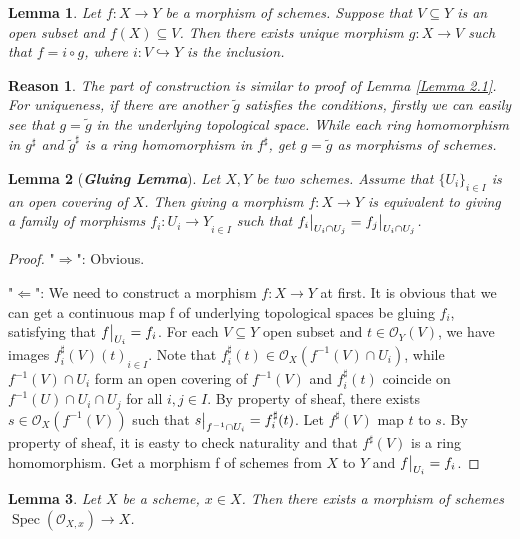 \documentclass{ctexart}
\newtheorem{lemma}{Lemma}[section]
\newtheorem{reason}{Reason}[section]
\newcommand{\spec}{\operatorname{Spec}}
\begin{document}
\begin{lemma}
    Let $f: X \longrightarrow Y$ be a morphism of schemes.
    Suppose that $V \subseteq Y$ is an open subset and $f(X) \subseteq V$.
    Then there exists unique morphism $g: X \longrightarrow V$ such that $f = i \circ g$, where $i: V \hookrightarrow Y$ is the inclusion.
    \label{Lemma 2.2}
\end{lemma}
\begin{reason}
    The part of construction is similar to proof of Lemma \ref{Lemma 2.1}.
    For uniqueness, if there are another $\widetilde{g}$ satisfies the conditions, firstly we can easily see that $g = \widetilde{g}$ in the underlying topological space.
    While each ring homomorphism in $g^{\sharp}$ and $\widetilde{g}^{\sharp}$ is a ring homomorphism in $f^{\sharp}$, get $g = \widetilde{g}$ as morphisms of schemes.
\end{reason}
\begin{lemma}[\textbf{\emph{Gluing Lemma}}]
    Let $X,Y$ be two schemes.
    Assume that $\{U_{i}\}_{i\in I}$ is an open covering of $X$.
    Then giving a morphism $f: X \longrightarrow Y$ is equivalent to giving a family of morphisms ${f_{i}: U_{i} \longrightarrow Y}_{i\in I}$ such that $f_{i}\big{|}_{U_{i} \cap U_{j}} = f_{j}\big{|}_{U_{i} \cap U_{j}}$.
    \label{Lemma 2.3}
\end{lemma}
\begin{proof}
    "$\Rightarrow$": Obvious.
    \par
    "$\Leftarrow$": We need to construct a morphism $f: X \longrightarrow Y$ at first.
    It is obvious that we can get a continuous map f of underlying topological spaces be gluing $f_{i}$, satisfying that $f\big{|}_{U_{i}} = f_{i}$.
    For each $V \subseteq Y$ open subset and $t\in \mathcal{O}_{Y}(V)$, we have images ${f_{i}^{\sharp}(V)(t)}_{i\in I}$.
    Note that $f_{i}^{\sharp}(t)\in \mathcal{O}_{X}(f^{-1}(V) \cap U_{i})$, while $f^{-1}(V) \cap U_{i}$ form an open covering of $f^{-1}(V)$ and $f_{i}^{\sharp}(t)$ coincide on $f^{-1}(U) \cap U_{i} \cap U_{j}$ for all $i,j\in I$.
    By property of sheaf, there exists $s\in \mathcal{O}_{X}(f^{-1}(V))$ such that $s\big{|}_{f^{-1} \cap U_{i}} = f_{i}^{\sharp}(t)$.
    Let $f^{\sharp}(V)$ map $t$ to $s$.
    By property of sheaf, it is easty to check naturality and that $f^{\sharp}(V)$ is a ring homomorphism.
    Get a morphism f of schemes from $X$ to $Y$ and $f\big{|}_{U_{i}} = f_{i}$.
\end{proof}
\begin{lemma}
    Let $X$ be a scheme, $x\in X$.
    Then there exists a morphism of schemes $\spec(\mathcal{O}_{X, x}) \longrightarrow X$.
    \label{Lemma 2.4}
\end{lemma}
\end{document}
